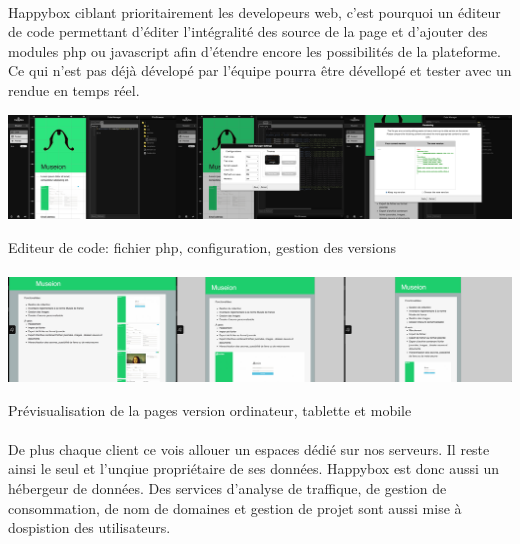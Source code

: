 \documentclass[11pt, a4paper ]{report}
\begin{document}
\paragraph{} %
Happybox ciblant prioritairement les developeurs web, c'est pourquoi un éditeur de code permettant d'éditer l'intégralité des source de la page et d'ajouter des modules php ou javascript afin d'étendre encore les possibilités de la plateforme. Ce qui n'est pas déjà dévelopé par l'équipe pourra être dévellopé et tester avec un rendue en temps réel. 
\begin{center}
	\includegraphics[width=\textwidth]{images/HBscreen/codeManager.png}
	\caption{Editeur de code: fichier php, configuration, gestion des versions}
\end{center}

\paragraph{}

\begin{center}
	\includegraphics[width=\textwidth]{images/HBscreen/preview.png}
	\caption{Prévisualisation de la pages version ordinateur, tablette et mobile}
\end{center}

\paragraph{}
De plus chaque client ce vois allouer un espaces dédié sur nos serveurs. Il reste ainsi le seul et l'unqiue propriétaire de ses données. Happybox est donc aussi un hébergeur de données. 
Des services d'analyse de traffique, de gestion de consommation, de nom de domaines et gestion de projet sont aussi mise à dospistion des utilisateurs.
\end{document}
